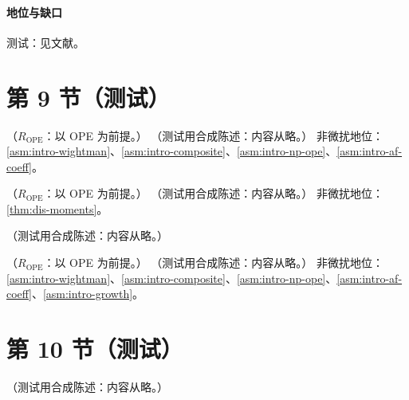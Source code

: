 \paragraph{地位与缺口}测试：见文献。

\section{第 9 节（测试）}\label{sec:dis-higher-twist}

\begin{proposition}\label{prop:dis-twist4}
（$R_{\mathrm{OPE}}$：以 OPE 为前提。）
（测试用合成陈述：内容从略。）
非微扰地位：\cref{asm:intro-wightman}、\cref{asm:intro-composite}、\cref{asm:intro-np-ope}、\cref{asm:intro-af-coeff}。
\end{proposition}

\begin{proposition}\label{prop:dis-tmc}
（$R_{\mathrm{OPE}}$：以 OPE 为前提。）
（测试用合成陈述：内容从略。）
非微扰地位：\cref{thm:dis-moments}。
\end{proposition}

\begin{example}[第二阶矩的靶质量修正]\label{ex:dis-tmc-n2}
（测试用合成陈述：内容从略。）
\end{example}

\begin{theorem}\label{thm:dis-bjorken}
（$R_{\mathrm{OPE}}$：以 OPE 为前提。）
（测试用合成陈述：内容从略。）
非微扰地位：\cref{asm:intro-wightman}、\cref{asm:intro-composite}、\cref{asm:intro-np-ope}、\cref{asm:intro-af-coeff}、\cref{asm:intro-growth}。
\end{theorem}

\section{第 10 节（测试）}\label{sec:dis-polarized}

\begin{remark}[Crewther 关系]\label{rem:dis-crewther}
（测试用合成陈述：内容从略。）
\end{remark}
